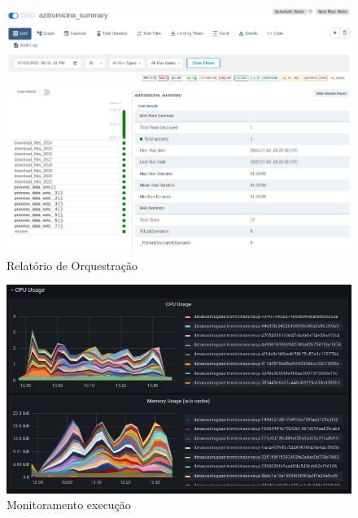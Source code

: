 \documentclass[10pt,brazil]{beamer}
\theoremstyle{definition}
\begin{document}
\begin{frame}[plain]
  \hspace*{-10mm}
  \begin{figure}
    \centering  
  \includegraphics[width=.7\paperwidth]{report_execution_summary.png}
      \caption[Airflow relatório]{Relatório de Orquestração}
  \end{figure}  
\end{frame}

\begin{frame}[plain]
  \hspace*{-10mm}
  \begin{figure}
    \centering  
  \includegraphics[width=.75\paperwidth]{etl_1_usage.png}
      \caption[Monitoramento execução]{Monitoramento execução}
  \end{figure}  
\end{frame}
\end{document}
